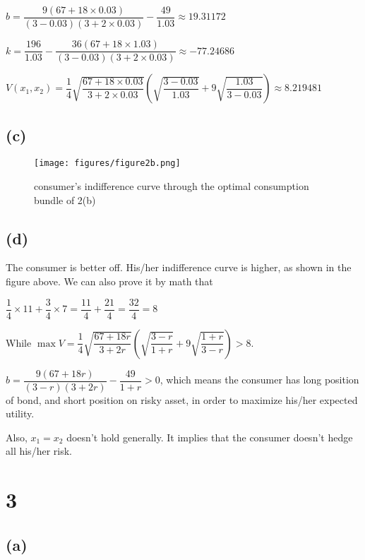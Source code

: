 \documentclass{article}
\begin{document}
$b=\dfrac{9\left(67+18\times0.03\right)}{\left(3-0.03\right)\left(3+2\times0.03\right)}-\dfrac{49}{1.03}\approx19.31172$

$k=\dfrac{196}{1.03}-\dfrac{36\left(67+18\times1.03\right)}{\left(3-0.03\right)\left(3+2\times0.03\right)}\approx-77.24686$

$V\left(x_{1},x_{2}\right)=\dfrac{1}{4}\sqrt{\dfrac{67+18\times0.03}{3+2\times0.03}}\left(\sqrt{\dfrac{3-0.03}{1.03}}+9\sqrt{\dfrac{1.03}{3-0.03}}\right)\approx8.219481$

\subsection*{(c)}

\begin{figure}[H]
    \begin{center}
        \texttt{[image: figures/figure2b.png]}
    \end{center}
    \caption{consumer's indifference curve through the optimal consumption bundle of 2(b)}
    \label{fig:graph}
\end{figure}

\subsection*{(d)}

The consumer is better off. His/her indifference curve is higher, as shown in the figure above. We can also prove it by math that

$\dfrac{1}{4}\times11+\dfrac{3}{4}\times7=\dfrac{11}{4}+\dfrac{21}{4}=\dfrac{32}{4}=8$

While $\max V=\dfrac{1}{4}\sqrt{\dfrac{67+18r}{3+2r}}\left(\sqrt{\dfrac{3-r}{1+r}}+9\sqrt{\dfrac{1+r}{3-r}}\right)>8$.

$b=\dfrac{9\left(67+18r\right)}{\left(3-r\right)\left(3+2r\right)}-\dfrac{49}{1+r}>0$, which means the consumer has long position of bond, and short position on risky asset, in order to maximize his/her expected utility.

Also, $x_{1}=x_{2}$ doesn't hold generally. It implies that the consumer doesn't hedge all his/her risk.

\section*{3}

\subsection*{(a)}
\end{document}

